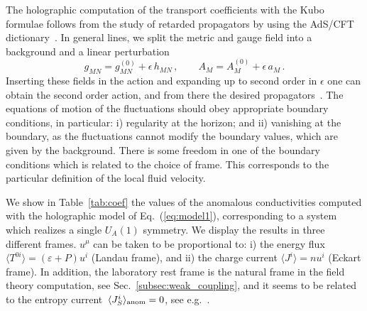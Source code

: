 \documentclass[a4paper]{jpconf}
\begin{document}
The holographic computation of the transport coefficients with the Kubo formulae follows from the study of retarded propagators by using the AdS/CFT dictionary~\cite{Son:2002sd,Herzog:2002pc}. In general lines, we split the metric and gauge field into a background and a linear perturbation
\begin{equation}
g_{MN} = g^{(0)}_{MN} + \epsilon \, h_{MN} \,, \qquad A_M = A_M^{(0)} + \epsilon \, a_M \,.
\end{equation}
Inserting these fields in the action and expanding up to second order in $\epsilon$ one can obtain the second order action, and from there the desired propagators~\cite{Kaminski:2009dh}. The equations of motion of the fluctuations should obey appropriate boundary conditions, in particular: i) regularity at the horizon; and ii) vanishing at the boundary, as the fluctuations cannot modify the boundary values, which are given by the background. There is some freedom in one of the boundary conditions which is related to the choice of frame. This corresponds to the particular definition of the local fluid velocity.


We show in Table~\ref{tab:coef} the values of the anomalous conductivities computed with the holographic model of Eq.~(\ref{eq:model1}), corresponding to a system which realizes a single $U_A(1)$ symmetry. We display the results in three different frames. $u^\mu$ can be taken to be proportional to: i) the energy flux $\langle T^{0i} \rangle = (\varepsilon + P) u^i$ (Landau frame), and ii) the charge current $\langle J^i \rangle = n u^i$ (Eckart frame). In addition, the laboratory rest frame is the natural frame in the field theory computation, see Sec.~\ref{subsec:weak_coupling}, and it seems to be related to the entropy current~$\langle J^i_S \rangle_{\textrm{\scriptsize anom}} = 0$, see e.g.~\cite{Megias:2013xla}.
\end{document}

